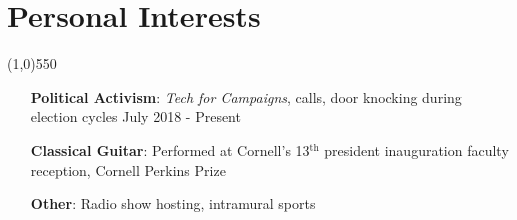 \documentclass[11pt]{article} %
\begin{document}
	\section*{Personal Interests}
	\vspace{-7ex}
	\begin{center}
    \line(1,0){550}
    \end{center}
    \vspace{-2ex}
	\begin{itemize}
		\item[\textbf{Political Activism}:] \textit{Tech for Campaigns}, calls, door knocking during election cycles \hfill July 2018 - Present %
		\item[\textbf{Classical Guitar}:] Performed at Cornell's 13$^\textrm{th}$ president inauguration faculty reception, Cornell Perkins Prize 
		\item[\textbf{Other}:] Radio show hosting, intramural sports
	\end{itemize}
	
\end{document}
